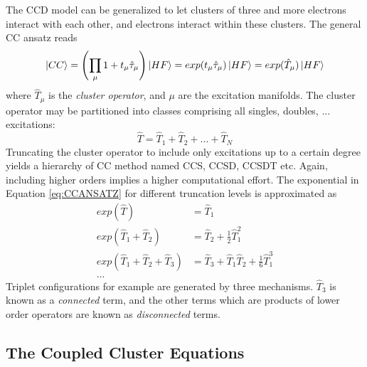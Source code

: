 The CCD model can be generalized to let clusters of three and more electrons interact with each other, and electrons interact within these clusters. The general CC ansatz reads
\begin{equation}
\ket{CC} = \left( \prod_{\mu} 1 + t_{\mu}\hat{\tau}_{\mu} \right) \ket{HF} = exp(t_{\mu}\hat{\tau}_{\mu}) \ket{HF} = exp(\hat{T}_{\mu}) \ket{HF}
\label{eq:CCANSATZ}
\end{equation}
\noindent where $\hat{T}_{\mu}$ is the \emph{cluster operator}, and $\mu$ are the excitation manifolds. The cluster operator may be partitioned into classes comprising all singles, doubles, ... excitations:
\begin{equation}
\hat{T} = \hat{T}_1 + \hat{T}_2 + ... + \hat{T}_N
\end{equation}
\noindent Truncating the cluster operator to include only excitations up to a certain degree yields a hierarchy of CC method named CCS, CCSD, CCSDT etc. Again, including higher orders implies a higher computational effort. The exponential in Equation \ref{eq:CCANSATZ} for different truncation levels is approximated as
\begin{align}
exp(\hat{T}) &= \hat{T}_1 \\
exp(\hat{T}_1 + \hat{T}_2) &= \hat{T}_2 + \frac{1}{2} \hat{T}_1^2 \\
exp(\hat{T}_1 + \hat{T}_2 + \hat{T}_3) &= \hat{T}_3 + \hat{T}_1 \hat{T}_2 + \frac{1}{6} \hat{T}_1^3 \\
\ldots \nonumber
\end{align}
\noindent Triplet configurations for example are generated by three mechanisms. $\hat{T}_3$ is known as a \emph{connected} term, and the other terms which are products of lower order operators are known as \emph{disconnected} terms. 

\subsection{The Coupled Cluster Equations} 

